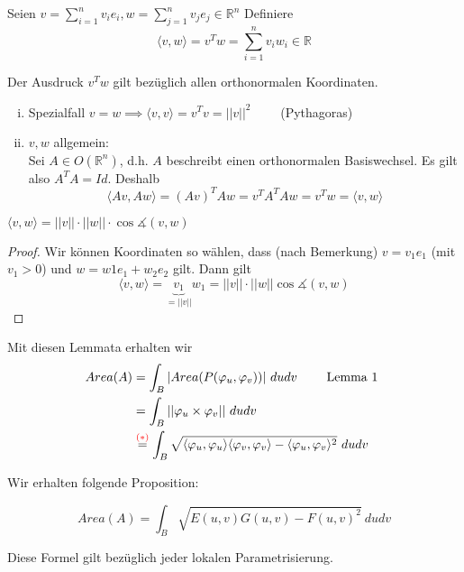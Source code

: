 \documentclass[../main.tex]{subfiles}
\begin{document}
\begin{einschub}
    Seien $v = \sum \limits_{i=1}^n v_ie_i, w = \sum \limits_{j=1}^n v_je_j \in \mathbb{R}^n$ 
    Definiere
    $$\langle v,w\rangle = v^Tw = \sum \limits_{i=1}^n v_iw_i \in \mathbb{R}$$
    \begin{remark}
        Der Ausdruck $v^Tw$ gilt bezüglich allen orthonormalen Koordinaten.
    \end{remark}
    \begin{enumerate}[i)]
        \item Spezialfall $v=w \implies \langle v,v \rangle = v^Tv = ||v||^2 \qquad$ (Pythagoras)
        \item $v,w$ allgemein: \\
        Sei $A \in O(\mathbb{R}^n)$, d.h. $A$ beschreibt einen orthonormalen Basiswechsel. Es gilt also
        $A^TA = Id$. Deshalb
        $$\langle Av, Aw \rangle = (Av)^TAw = v^TA^TAw=v^Tw = \langle v,w\rangle $$
    \end{enumerate}
    \begin{lemma}
        $\langle v,w \rangle = ||v||\cdot ||w|| \cdot \cos \measuredangle (v,w)$
    \end{lemma}
    \begin{proof}
        Wir können Koordinaten so wählen, dass (nach Bemerkung) $v=v_1e_1$ (mit $v_1>0$) und $w=w1e_1+w_2e_2$ gilt.
        Dann gilt
        $$\langle v,w \rangle = \underbrace{v_1}_{=||v||}w_1 = ||v|| \cdot ||w|| \cos \measuredangle(v,w)$$
    \end{proof}
    Mit diesen Lemmata erhalten wir
    \begin{align*}
        Area(A) &= \int _B |Area(P(\varphi _u, \varphi _v))|\ dudv \qquad \text { Lemma 1 }\\
        &= \int _B ||\varphi _u \times \varphi _v || \ dudv \\
        &\overset{\textcolor{red}{(*)}}{=} \int _B \sqrt{\langle \varphi _u, \varphi_u \rangle \langle \varphi _v, \varphi _v\rangle- \langle \varphi _u, \varphi_v\rangle ^2} \ dudv
    \end{align*}
\end{einschub}
Wir erhalten folgende Proposition:
\begin{proposition}
    $$Area(A) = \int _B \sqrt{E(u,v)G(u,v)-F(u,v)^2}\ dudv$$
\end{proposition}
\begin{remark}
    Diese Formel gilt bezüglich jeder lokalen Parametrisierung.
\end{remark}
\end{document}
